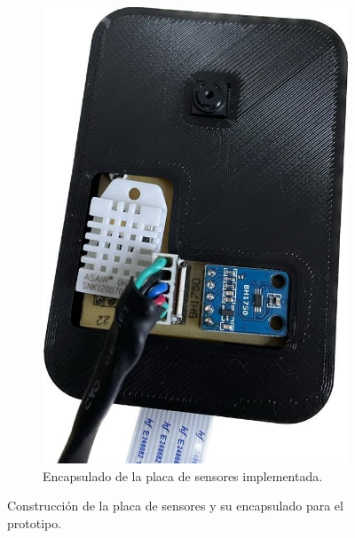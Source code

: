 \begin{figure}[H]
\begin{subfigure}{0.3\textwidth}
        	\includegraphics[width=\linewidth]{ImagenesConstruccion del prototipo/sensores_encapsulado_prototipo_alt}
        	\caption{Encapsulado de la placa de sensores implementada.}
			\label{fig:sensores_encapsulado_prototipo_alt}
        \end{subfigure}
	\caption{Construcción de la placa de sensores y su encapsulado para el prototipo.}
	\label{fig:sensores_prototipado}
\end{figure}

